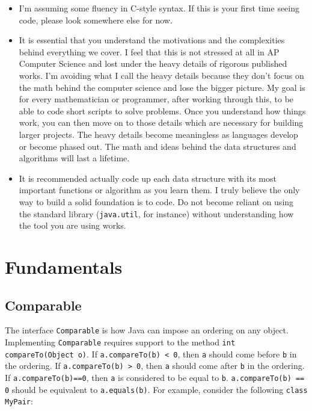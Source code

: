 \documentclass[11pt]{book}
\begin{document}
\begin{itemize}

\item

I'm assuming some fluency in C-style syntax. If this is your first time seeing code, please look somewhere else for now.

\item

It is essential that you understand the motivations and the complexities behind everything we cover. I feel that this is not stressed at all in AP Computer Science and lost under the heavy details of rigorous published works. I'm avoiding what I call the heavy details because they don't focus on the math behind the computer science and lose the bigger picture. My goal is for every mathematician or programmer, after working through this, to be able to code short scripts to solve problems. Once you understand how things work, you can then move on to those details which are necessary for building larger projects. The heavy details become meaningless as languages develop or become phased out. The math and ideas behind the data structures and algorithms will last a lifetime.

\item

It is recommended actually code up each data structure with its most important functions or algorithm as you learn them. I truly believe the only way to build a solid foundation is to code. Do not become reliant on using the standard library (\texttt{java.util}, for instance) without understanding how the tool you are using works.

\end{itemize}

\mainmatter

\chapter{Fundamentals}

\section{Comparable}

The interface \texttt{Comparable} is how Java can impose an ordering on any object. Implementing \texttt{Comparable} requires support to the method \texttt{int compareTo(Object o)}. If \texttt{a.compareTo(b) < 0}, then \texttt{a} should come before \texttt{b} in the ordering. If \texttt{a.compareTo(b) > 0}, then \texttt{a} should come after \texttt{b} in the ordering. If \texttt{a.compareTo(b)==0}, then \texttt{a} is considered to be equal to \texttt{b}. \texttt{a.compareTo(b) == 0} should be equivalent to \texttt{a.equals(b)}. For example, consider the following \texttt{class MyPair}:
\end{document}
